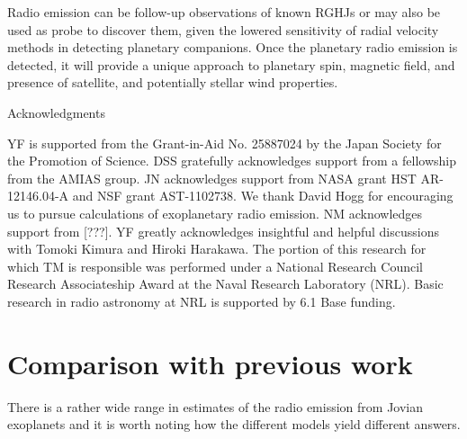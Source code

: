 \documentclass[iop,numberedappendix,apj]{emulateapj}
\begin{document}
Radio emission can be follow-up observations of known RGHJs or may also be used as probe to discover them, given the lowered sensitivity of  radial velocity methods in detecting planetary companions. 
Once the planetary radio emission is detected, it will provide a unique approach to  planetary spin, magnetic field, and presence of satellite, and potentially stellar wind properties. 




\vspace{0.5in}

\acknowledgements

{\sc Acknowledgments}

YF is supported from the Grant-in-Aid No. 25887024 by the Japan Society for the Promotion of Science.
DSS gratefully acknowledges support from a fellowship from the AMIAS group. JN acknowledges support from NASA grant HST AR-12146.04-A and NSF grant AST-1102738.
We thank David Hogg for encouraging us to pursue calculations of exoplanetary radio emission.
NM acknowledges support from [???]. 
YF greatly acknowledges insightful and helpful discussions with Tomoki Kimura and Hiroki Harakawa. 
The portion of this research for which TM is responsible was performed under a National Research 
Council Research Associateship Award at the Naval Research Laboratory (NRL).
Basic research in radio astronomy at NRL is supported by 6.1 Base funding.





\newpage

\appendix

\section{Comparison with previous work}
\label{sec:AppendixA}

There is a rather wide range in estimates of the radio emission from Jovian exoplanets and it is worth noting how the different models yield different answers. 
\end{document}
